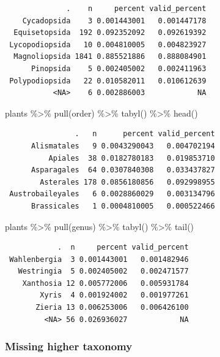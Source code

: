 \documentclass[
  letterpaper,
  DIV=11,
  numbers=noendperiod,
  oneside]{scrreprt}
\newenvironment{Shaded}{\begin{snugshade}}{\end{snugshade}}
\newcommand{\FunctionTok}[1]{\textcolor[rgb]{0.28,0.35,0.67}{#1}}
\newcommand{\NormalTok}[1]{\textcolor[rgb]{0.00,0.23,0.31}{#1}}
\newcommand{\SpecialCharTok}[1]{\textcolor[rgb]{0.37,0.37,0.37}{#1}}
\begin{document}
\begin{verbatim}
              .    n     percent valid_percent
    Cycadopsida    3 0.001443001   0.001447178
  Equisetopsida  192 0.092352092   0.092619392
 Lycopodiopsida   10 0.004810005   0.004823927
  Magnoliopsida 1841 0.885521886   0.888084901
      Pinopsida    5 0.002405002   0.002411963
 Polypodiopsida   22 0.010582011   0.010612639
           <NA>    6 0.002886003            NA
\end{verbatim}

\begin{Shaded}
\begin{Highlighting}[]
\NormalTok{plants }\SpecialCharTok{\%\textgreater{}\%} 
  \FunctionTok{pull}\NormalTok{(order) }\SpecialCharTok{\%\textgreater{}\%} 
  \FunctionTok{tabyl}\NormalTok{() }\SpecialCharTok{\%\textgreater{}\%} 
  \FunctionTok{head}\NormalTok{()}
\end{Highlighting}
\end{Shaded}

\begin{verbatim}
                .   n      percent valid_percent
      Alismatales   9 0.0043290043   0.004702194
          Apiales  38 0.0182780183   0.019853710
      Asparagales  64 0.0307840308   0.033437827
        Asterales 178 0.0856180856   0.092998955
 Austrobaileyales   6 0.0028860029   0.003134796
      Brassicales   1 0.0004810005   0.000522466
\end{verbatim}

\begin{Shaded}
\begin{Highlighting}[]
\NormalTok{plants }\SpecialCharTok{\%\textgreater{}\%} 
  \FunctionTok{pull}\NormalTok{(genus) }\SpecialCharTok{\%\textgreater{}\%} 
  \FunctionTok{tabyl}\NormalTok{() }\SpecialCharTok{\%\textgreater{}\%} 
  \FunctionTok{tail}\NormalTok{()}
\end{Highlighting}
\end{Shaded}

\begin{verbatim}
            .  n     percent valid_percent
 Wahlenbergia  3 0.001443001   0.001482946
   Westringia  5 0.002405002   0.002471577
    Xanthosia 12 0.005772006   0.005931784
        Xyris  4 0.001924002   0.001977261
       Zieria 13 0.006253006   0.006426100
         <NA> 56 0.026936027            NA
\end{verbatim}

\hypertarget{missing-higher-taxonomy}{%
\subsubsection*{Missing higher taxonomy}\label{missing-higher-taxonomy}}
\end{document}
